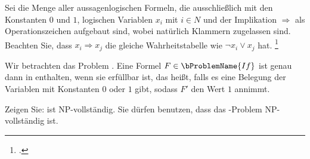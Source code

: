 \documentclass{bschlangaul-aufgabe}
\begin{document}

Sei  die Menge aller aussagenlogischen Formeln, die
ausschließlich mit den Konstanten $0$ und $1$, logischen Variablen $x_i$
mit $i \in N$ und der Implikation $\Rightarrow$ als Operationszeichen
aufgebaut sind, wobei natürlich Klammern zugelassen sind. Beachten Sie,
dass $x_i \Rightarrow x_j$ die gleiche Wahrheitstabelle wie $\neg x_i
\lor x_j$ hat.
\footcite{examen:66115:2020:09}

Wir betrachten das Problem . Eine Formel $F \in
\bProblemName{If}$ ist genau dann in  enthalten,
wenn sie erfüllbar ist, das heißt, falls es eine Belegung der Variablen
mit Konstanten $0$ oder $1$ gibt, sodass $F'$ den Wert $1$ annimmt.

Zeigen Sie:  ist NP-vollständig. Sie dürfen
benutzen, dass das -Problem NP-vollständig ist.

\begin{bAntwort}

\end{bAntwort}
\end{document}
